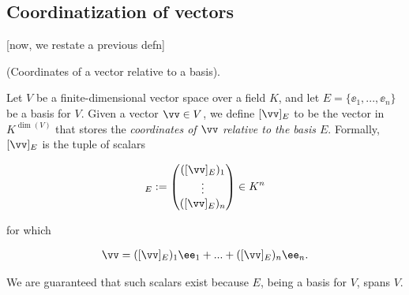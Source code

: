 \subsection*{Coordinatization of vectors}

[now, we restate a previous defn]

\begin{defn}
\label{ch::lin_alg::defn::coordinates_relative_to_basis}

    (Coordinates of a vector relative to a basis).
    
    Let $V$ be a finite-dimensional vector space over a field $K$, and let $E = \{\ee_1, ..., \ee_n\}$ be a basis for $V$. Given a vector $\vv \in V$, we define $[\vv]_E$ to be the vector in $K^{\dim(V)}$ that stores the \textit{coordinates of $\vv$ relative to the basis $E$}. Formally, $[\vv]_E$ is the tuple of scalars 
    
    \begin{align*}
        [\vv]_E := \begin{pmatrix} ([\vv]_E)_1 \\ \vdots \\ ([\vv]_E)_n \end{pmatrix} \in K^n
    \end{align*}
    
    for which
    
    \begin{align*}
        \vv = ([\vv]_E)_1 \ee_1 + ... + ([\vv]_E)_n \ee_n.
    \end{align*}
    
    We are guaranteed that such scalars exist because $E$, being a basis for $V$, spans $V$.
\end{defn}

